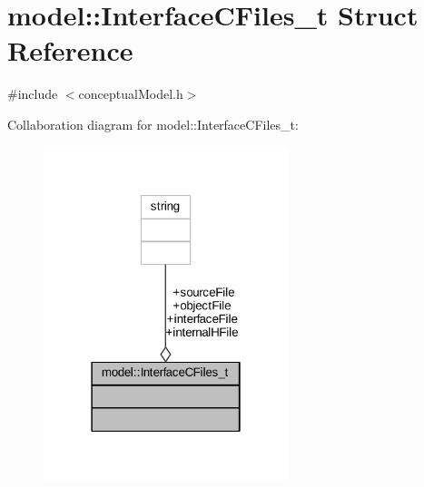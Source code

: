 \hypertarget{structmodel_1_1_interface_c_files__t}{}\section{model\+:\+:Interface\+C\+Files\+\_\+t Struct Reference}
\label{structmodel_1_1_interface_c_files__t}


{\ttfamily \#include $<$conceptual\+Model.\+h$>$}



Collaboration diagram for model\+:\+:Interface\+C\+Files\+\_\+t\+:
\nopagebreak
\begin{figure}[H]
\begin{center}
\leavevmode
\includegraphics[width=202pt]{structmodel_1_1_interface_c_files__t__coll__graph}
\end{center}
\end{figure}
